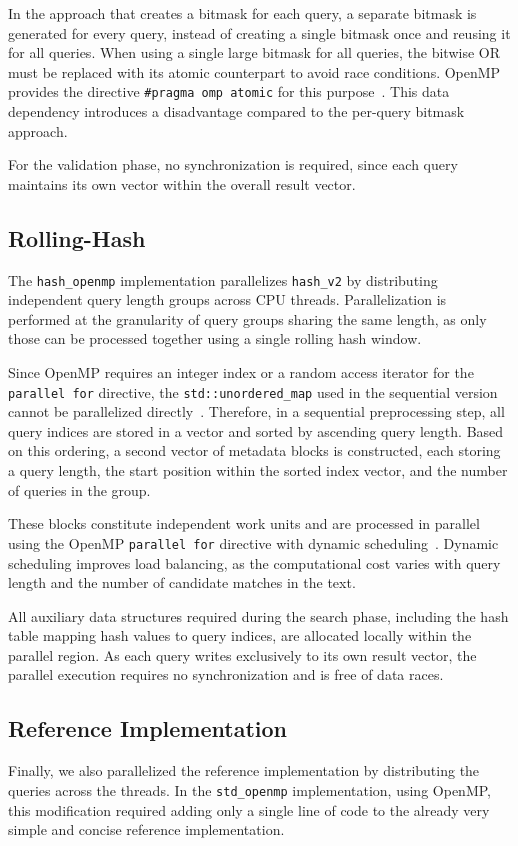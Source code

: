 \documentclass{article}
\begin{document}
    In the approach that creates a bitmask for each query, a separate bitmask is generated for every query, instead of creating a single bitmask once and reusing it for all queries.
    When using a single large bitmask for all queries, the bitwise OR must be replaced with its atomic counterpart to avoid race conditions.
    OpenMP provides the directive \texttt{\#pragma omp atomic} for this purpose~\cite{openmp}.
    This data dependency introduces a disadvantage compared to the per-query bitmask approach.

    For the validation phase, no synchronization is required, since each query maintains its own vector within the overall result vector.

    \subsection{Rolling-Hash}
    The \texttt{hash\_openmp} implementation parallelizes \texttt{hash\_v2} by distributing independent query length groups across CPU threads.
    Parallelization is performed at the granularity of query groups sharing the same length, as only those can be processed together using a single rolling hash window.

    Since OpenMP requires an integer index or a random access iterator for the \texttt{parallel for} directive, the \texttt{std::unordered\_map} used in the sequential version cannot be parallelized directly~\cite{openmp}.
    Therefore, in a sequential preprocessing step, all query indices are stored in a vector and sorted by ascending query length.
    Based on this ordering, a second vector of metadata blocks is constructed, each storing a query length, the start position within the sorted index vector, and the number of queries in the group.

    These blocks constitute independent work units and are processed in parallel using the OpenMP \texttt{parallel for} directive with dynamic scheduling~\cite{openmp}.
    Dynamic scheduling improves load balancing, as the computational cost varies with query length and the number of candidate matches in the text.

    All auxiliary data structures required during the search phase, including the hash table mapping hash values to query indices, are allocated locally within the parallel region.
    As each query writes exclusively to its own result vector, the parallel execution requires no synchronization and is free of data races.

    \subsection{Reference Implementation}
    Finally, we also parallelized the reference implementation by distributing the queries across the threads.
    In the \texttt{std\_openmp} implementation, using OpenMP, this modification required adding only a single line of code to the already very simple and concise reference implementation.
\end{document}
